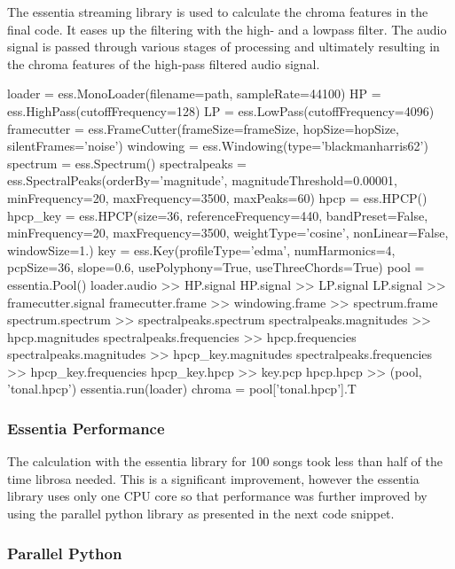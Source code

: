 The essentia streaming library is used to calculate the chroma features in the final code. It eases up the filtering with the high- and a lowpass filter. The audio signal is passed through various stages of processing and ultimately resulting in the chroma features of the high-pass filtered audio signal. 
\begin{pythonCode}[frame=single,label={lst:essst},caption={essentia streaming},captionpos=b]
loader = ess.MonoLoader(filename=path, sampleRate=44100)
HP = ess.HighPass(cutoffFrequency=128)
LP = ess.LowPass(cutoffFrequency=4096)
framecutter = ess.FrameCutter(frameSize=frameSize, hopSize=hopSize, 
	silentFrames='noise')
windowing = ess.Windowing(type='blackmanharris62')
spectrum = ess.Spectrum()
spectralpeaks = ess.SpectralPeaks(orderBy='magnitude', magnitudeThreshold=0.00001, 
	minFrequency=20, maxFrequency=3500, maxPeaks=60)
hpcp = ess.HPCP()
hpcp_key = ess.HPCP(size=36, referenceFrequency=440, bandPreset=False, minFrequency=20,
	maxFrequency=3500, weightType='cosine', nonLinear=False, windowSize=1.)
key = ess.Key(profileType='edma', numHarmonics=4, pcpSize=36, slope=0.6, 
	usePolyphony=True, useThreeChords=True)
pool = essentia.Pool()
loader.audio >> HP.signal
HP.signal >> LP.signal
LP.signal >> framecutter.signal    
framecutter.frame >> windowing.frame >> spectrum.frame
spectrum.spectrum >> spectralpeaks.spectrum
spectralpeaks.magnitudes >> hpcp.magnitudes
spectralpeaks.frequencies >> hpcp.frequencies
spectralpeaks.magnitudes >> hpcp_key.magnitudes
spectralpeaks.frequencies >> hpcp_key.frequencies
hpcp_key.hpcp >> key.pcp
hpcp.hpcp >> (pool, 'tonal.hpcp')
essentia.run(loader)
chroma = pool['tonal.hpcp'].T
\end{pythonCode}	

\subsubsection{Essentia Performance}

The calculation with the essentia library for 100 songs took less than half of the time librosa needed. This is a significant improvement, however the essentia library uses only one CPU core so that performance was further improved by using the parallel python library as presented in the next code snippet.

\subsubsection{Parallel Python}

